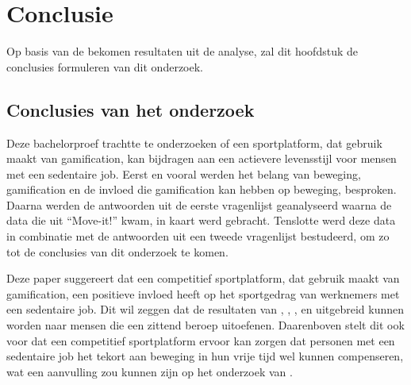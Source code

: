 
\chapter{Conclusie}%
\label{ch:conclusie}

Op basis van de bekomen resultaten uit de analyse, zal dit hoofdstuk de conclusies formuleren van dit onderzoek.


\section{Conclusies van het onderzoek}

Deze bachelorproef trachtte te onderzoeken of een sportplatform, dat gebruik \linebreak maakt van gamification, kan bijdragen aan een actievere levensstijl voor mensen met een sedentaire job.
Eerst en vooral werden het belang van beweging, gamification en de invloed die gamification kan hebben op beweging, besproken. Daarna werden de antwoorden uit de eerste vragenlijst geanalyseerd waarna de data die uit ``Move-it!'' kwam, in kaart werd gebracht. Tenslotte werd deze data in combinatie met de antwoorden uit een tweede vragenlijst bestudeerd, om zo tot de conclusies van dit onderzoek te komen.

Deze paper suggereert dat een competitief sportplatform, dat gebruik maakt van gamification, een positieve invloed heeft op het sportgedrag van werknemers met een sedentaire job. Dit wil zeggen dat de resultaten van \textcite{Kari2016}, \textcite{Tu2019}, \textcite{Lewis2016}, \textcite{Liu2017} en \textcite{Tabak2015} uitgebreid kunnen worden naar mensen die een zittend beroep uitoefenen. Daarenboven stelt dit ook voor dat een competitief sportplatform ervoor kan zorgen dat personen met een sedentaire job het tekort aan beweging in hun vrije tijd wel kunnen compenseren, wat een aanvulling zou kunnen zijn op het onderzoek van \textcite{Vandelanotte2015}.

